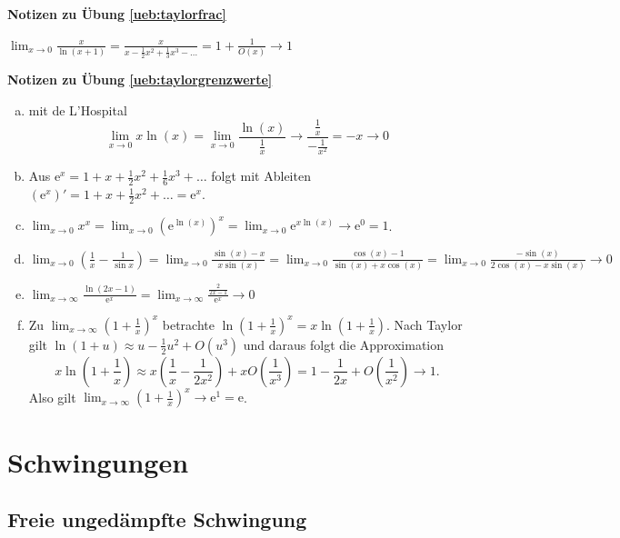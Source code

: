 \documentclass[%
11pt,%
twoside,%
titlepage,%
swissgerman,%
headsepline%
]{scrartcl}
\newcommand{\faReturnGray}{\textcolor{gray}{\faMailReply}} %
\theoremstyle{definition}
\theoremstyle{plain}
\newcommand{\concatueb}[1]{ueb:#1}%
\newcommand{\concatlsg}[1]{lsg:#1}%
\newenvironment{lsg}[1]{%
    \par\noindent\textbf{Notizen zu Übung \ref{\concatueb{#1}}}\label{\concatlsg{#1}}
    \hfill\hyperref[\concatueb{#1}]{\faReturnGray}\par %
}{%
    \par%
}
\begin{document}
\begin{lsg}{taylorfrac}
    $\lim_{x\to0}\frac{x}{\ln(x+1)}=\frac{x}{x-\frac{1}{2}x^2+\frac{1}{3}x^3-\dots}=1+\frac{1}{O(x)}\to1$
\end{lsg}
\begin{lsg}{taylorgrenzwerte}
    \begin{enumerate}[a)]
        \item mit de L'Hospital
        $$\lim_{x\to0}x\ln(x)=\lim_{x\to0}\frac{\ln(x)}{\frac{1}{x}}\to\frac{\frac{1}{x}}{-\frac{1}{x^2}}=-x\to0$$
        \item Aus $\mathrm{e}^x=1+x+\frac{1}{2}x^2+\frac{1}{6}x^3+\dots$ folgt mit Ableiten
        $(\mathrm{e}^x)'=1+x+\frac{1}{2}x^2+\dots=\mathrm{e}^x$.
        \item $\lim_{x\to0}x^x=\lim_{x\to0}(\mathrm{e}^{\ln(x)})^x=\lim_{x\to0}\mathrm{e}^{x\ln(x)}\to\mathrm{e}^0=1$.
        \item $\lim_{x\to0}\left(\frac{1}{x}-\frac{1}{\sin x}\right)=\lim_{x\to0}\frac{\sin(x)-x}{x\sin(x)}=\lim_{x\to0}\frac{\cos(x)-1}{\sin(x)+x\cos(x)}=\lim_{x\to0}\frac{-\sin(x)}{2\cos(x)-x\sin(x)}\to0$
        \item $\lim_{x\to\infty}\frac{\ln(2x-1)}{\mathrm{e}^x}=\lim_{x\to\infty}\frac{\frac{2}{2x-1}}{\mathrm{e}^x}\to0$
        \item Zu $\lim_{x\to\infty}\left(1+\frac{1}{x}\right)^x$ betrachte $\ln\left(1+\frac{1}{x}\right)^x=x\ln\left(1+\frac{1}{x}\right)$. Nach Taylor gilt $\ln(1+u)\approx u-\frac{1}{2}u^2+O(u^3)$ und daraus folgt die Approximation
        $$x\ln\left(1+\frac{1}{x}\right)\approx x\left(\frac{1}{x}-\frac{1}{2x^2}\right)+xO(\frac{1}{x^3})=1-\frac{1}{2x}+O(\frac{1}{x^2})\to1.$$
        Also gilt $\lim_{x\to\infty}\left(1+\frac{1}{x}\right)^x\to\mathrm{e}^1=\mathrm{e}$.
    \end{enumerate}
\end{lsg}

\clearpage

\section{Schwingungen}
\subsection{Freie ungedämpfte Schwingung}
\end{document}
